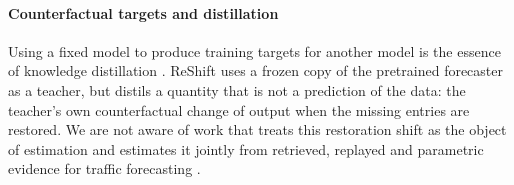 \paragraph{Counterfactual targets and distillation}
Using a fixed model to produce training targets for another model is the essence of knowledge distillation \citep{hinton2015distilling}. ReShift uses a frozen copy of the pretrained forecaster as a teacher, but distils a quantity that is not a prediction of the data: the teacher's own counterfactual change of output when the missing entries are restored. We are not aware of work that treats this restoration shift as the object of estimation and estimates it jointly from retrieved, replayed and parametric evidence for traffic forecasting .
